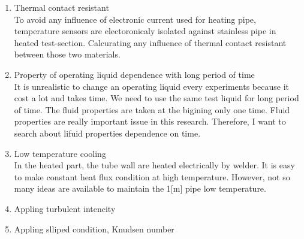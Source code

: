 \documentclass[conference]{IEEEtran}
\begin{document}
\begin{enumerate}
  \item Thermal contact resistant\\
  To avoid any influence of electronic current used for heating pipe, temperature sensors are electoronicaly isolated against stainless pipe in heated test-section.
  Calcurating any influence of thermal contact resistant between those two materials.
  \item Property of operating liquid dependence with long period of time\\
  It is unrealistic to change an operating liquid every experiments because it cost a lot and takes time.
  We need to use the same test liquid for long period of time.
  The fluid properties are taken at the bigining only one time.
  Fluid properties are really important issue in this research.
  Therefore, I want to search about lifuid properties dependence on time.
  \item Low temperature cooling\\
  In the heated part, the tube wall are heated electrically by welder.
  It is easy to make constant heat flux condition at high temperature.
  However, not so many ideas are available to maintain the 1[m] pipe low temperature.
  \item Appling turbulent intencity
  \item Appling slliped condition, Knudsen number
\end{enumerate}
\end{document}
